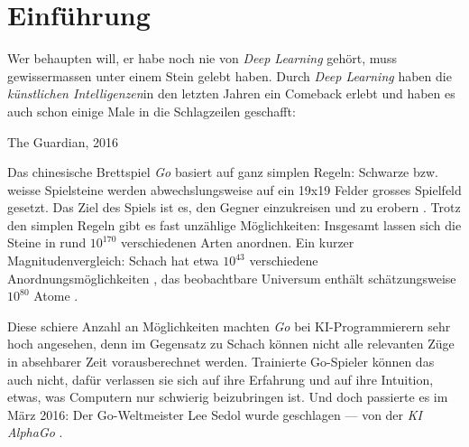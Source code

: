 \section{Einführung}

Wer behaupten will, er habe noch nie von \textit{Deep Learning} gehört, muss gewissermassen unter einem Stein gelebt haben. Durch \textit{Deep Learning} haben die \textit{künstlichen Intelligenzen}\footnotemark  in den letzten Jahren ein Comeback erlebt und haben es auch schon einige Male in die Schlagzeilen geschafft:

\epigraph{}{ The Guardian, 2016}



\begin{minipage}{13.5cm}
Das chinesische Brettspiel \textit{Go} basiert auf ganz simplen Regeln: Schwarze bzw. weisse Spielsteine werden abwechslungsweise auf ein 19x19 Felder grosses Spielfeld gesetzt. Das Ziel des Spiels ist es, den Gegner einzukreisen und zu erobern \cite{howtogo}. Trotz den simplen Regeln gibt es fast unzählige Möglichkeiten: Insgesamt lassen sich die Steine in rund $10^{170}$ verschiedenen Arten anordnen. Ein kurzer Magnitudenvergleich: Schach hat etwa $10^{43}$ verschiedene Anordnungsmöglichkeiten \cite{shannon}, das beobachtbare Universum enthält schätzungsweise $10^{80}$ Atome \cite{atoms}.

Diese schiere Anzahl an Möglichkeiten machten \textit{Go} bei KI-Programmierern sehr hoch angesehen, denn im Gegensatz zu Schach können nicht alle relevanten Züge in absehbarer Zeit vorausberechnet werden\footnotemark. Trainierte Go-Spieler können das auch nicht, dafür verlassen sie sich auf ihre Erfahrung und auf ihre Intuition, etwas, was Computern nur schwierig beizubringen ist. Und doch passierte es im März 2016: Der Go-Weltmeister Lee Sedol wurde geschlagen --- von der \textit{KI AlphaGo} \cite{alphago}.
\end{minipage}


